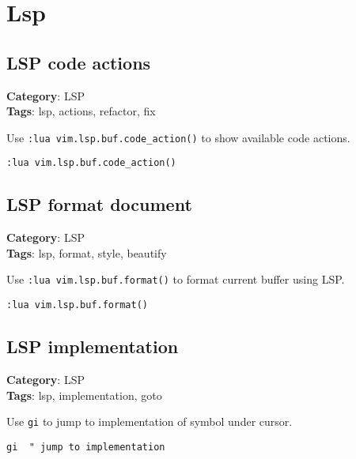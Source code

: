 {{{{{\chapter{Lsp}
\section{LSP code actions}

\textbf{Category}: LSP\\ \textbf{Tags}: lsp, actions, refactor, fix
\vspace{0.5cm}

Use {\footnotesize \Verb§:lua vim.lsp.buf.code_action()§} to show available code actions.

\begin{Exa*}{}
\begin{Verbatim}[fontsize=\footnotesize, breaklines, breakanywhere]
:lua vim.lsp.buf.code_action()
\end{Verbatim}
\end{Exa*}

\section{LSP format document}

\textbf{Category}: LSP\\ \textbf{Tags}: lsp, format, style, beautify
\vspace{0.5cm}

Use {\footnotesize \Verb§:lua vim.lsp.buf.format()§} to format current buffer using LSP.

\begin{Exa*}{}
\begin{Verbatim}[fontsize=\footnotesize, breaklines, breakanywhere]
:lua vim.lsp.buf.format()
\end{Verbatim}
\end{Exa*}

\section{LSP implementation}

\textbf{Category}: LSP\\ \textbf{Tags}: lsp, implementation, goto
\vspace{0.5cm}

Use {\footnotesize \Verb§gi§} to jump to implementation of symbol under cursor.

\begin{Exa*}{}
\begin{Verbatim}[fontsize=\footnotesize, breaklines, breakanywhere]
gi  " jump to implementation
\end{Verbatim}
\end{Exa*}

}}}}}
